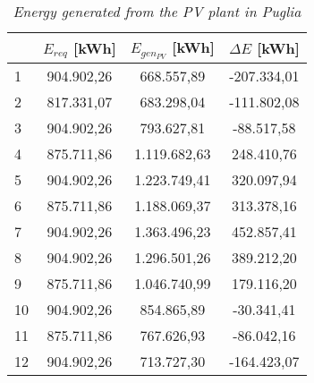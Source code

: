 \begin{table}[h]
\centering
\begin{tabular}{|l|c|c|c|}
\hline
\rowcolor{bluepoli!40}\multicolumn{1}{|c|}{\textbf{Month}} & \textbf{$E_{req}$ [kWh]} & \textbf{$E_{gen_{PV}}$ [kWh]} & \textbf{$\Delta E$ [kWh]} \\ \hline
1     & 904.902,26                            & 668.557,89                         & -207.334,01                   \\ \hline
2     & 817.331,07                            & 683.298,04                         & -111.802,08                   \\ \hline
3     & 904.902,26                            & 793.627,81                         & -88.517,58                    \\ \hline
4     & 875.711,86                            & 1.119.682,63                       & 248.410,76                    \\ \hline
5     & 904.902,26                            & 1.223.749,41                       & 320.097,94                    \\ \hline
6     & 875.711,86                            & 1.188.069,37                       & 313.378,16                    \\ \hline
7     & 904.902,26                            & 1.363.496,23                       & 452.857,41                    \\ \hline
8     & 904.902,26                            & 1.296.501,26                       & 389.212,20                    \\ \hline
9     & 875.711,86                            & 1.046.740,99                       & 179.116,20                    \\ \hline
10    & 904.902,26                            & 854.865,89                         & -30.341,41                    \\ \hline
11    & 875.711,86                            & 767.626,93                         & -86.042,16                    \\ \hline
12    & 904.902,26                            & 713.727,30                         & -164.423,07                   \\ \hline
\end{tabular}
\caption{\textit{Energy generated from the PV plant in Puglia}}
\label{tab:pvplantpuglia}
\end{table}